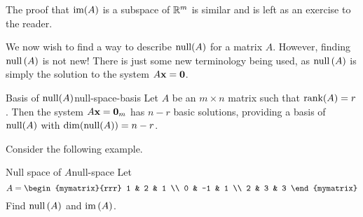 The proof that $\mbox{\rm im}(A)$ is a subspace of $\mathbb{R}^m$ is similar and is left as an exercise to the reader. 

We now wish to find a way to describe $\mbox{\rm null}(A)$ for a matrix $A$. However, finding $\mbox{\rm null} \left(A\right)$ is not new! There is just some new
terminology being used, as $\mbox{\rm null} \left(A\right) $ is simply the solution
to the system $A\mbox{\bf x}=\mbox{\bf 0}$.

\begin{theorem}{Basis of $\mbox{\rm null}(A)$}{null-space-basis}
Let $A$ be an $m \times n$ matrix such that $\mbox{\rm rank}(A) = r$. Then the system $A\mbox{\bf x}=\mbox{\bf 0}_m$ has $n-r$ basic solutions, providing a basis of $\mbox{\rm null}(A)$ with $\dim(\mbox{\rm null}(A))=n-r$.
\end{theorem}

Consider the following example. 

\begin{example}{Null space of $A$}{null-space}
Let
\begin{equation*}
A=\begin{mymatrix}{rrr}
1 & 2 & 1 \\
0 & -1 & 1 \\
2 & 3 & 3
\end{mymatrix} 
\end{equation*}
Find $\mbox{\rm null} \left(A\right) $ and $\mbox{\rm im}\left(A\right)$.
\end{example}

